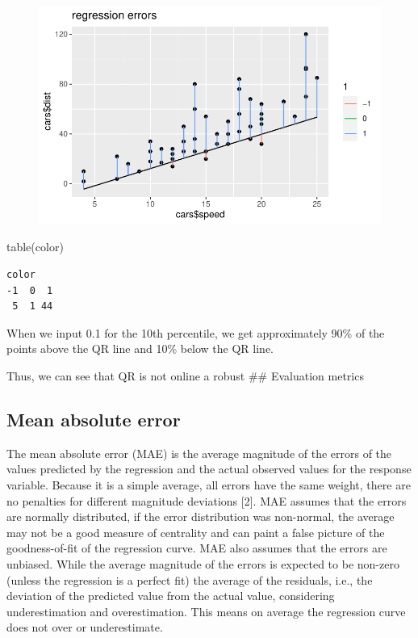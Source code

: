 \documentclass[
  letterpaper,
  DIV=11,
  numbers=noendperiod]{scrreprt}
\newenvironment{Shaded}{\begin{snugshade}}{\end{snugshade}}
\newcommand{\FunctionTok}[1]{\textcolor[rgb]{0.28,0.35,0.67}{#1}}
\newcommand{\NormalTok}[1]{\textcolor[rgb]{0.00,0.23,0.31}{#1}}
\begin{document}
\begin{figure}[H]

{\centering \includegraphics{methods_files/figure-pdf/unnamed-chunk-6-1.pdf}

}

\end{figure}

\begin{Shaded}
\begin{Highlighting}[]
\FunctionTok{table}\NormalTok{(color)}
\end{Highlighting}
\end{Shaded}

\begin{verbatim}
color
-1  0  1 
 5  1 44 
\end{verbatim}

When we input 0.1 for the 10th percentile, we get approximately 90\% of
the points above the QR line and 10\% below the QR line.

Thus, we can see that QR is not online a robust \#\# Evaluation metrics

\hypertarget{mean-absolute-error}{%
\subsection{Mean absolute error}\label{mean-absolute-error}}

The mean absolute error (MAE) is the average magnitude of the errors of
the values predicted by the regression and the actual observed values
for the response variable. Because it is a simple average, all errors
have the same weight, there are no penalties for different magnitude
deviations {[}2{]}. MAE assumes that the errors are normally
distributed, if the error distribution was non-normal, the average may
not be a good measure of centrality and can paint a false picture of the
goodness-of-fit of the regression curve. MAE also assumes that the
errors are unbiased. While the average magnitude of the errors is
expected to be non-zero (unless the regression is a perfect fit) the
average of the residuals, i.e., the deviation of the predicted value
from the actual value, considering underestimation and overestimation.
This means on average the regression curve does not over or
underestimate.
\end{document}
